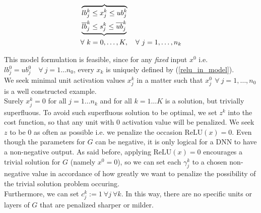 \documentclass{article}
\begin{document}
\begin{align} 
&\overbrace{
lb_j^k \leq x_j^k \leq ub_j^k} \notag \\
&\underbrace{ \overline{lb}_j^k \leq s_j^k \leq \overline{ub}_j^k }   \notag \\
& \forall \ k =0, \ldots, K, \quad \forall \ j=1, \ldots, n_k \label{MILP_model3}
\end{align}


This model formulation is feasible, since for any \textit{fixed} input $x^0$ i.e. $lb_j^0 = ub_j^0 \quad \forall \ j=1 \ldots n_0$, every $x_k$ is uniquely defined by (\ref{relu_in_model}).\\
We seek minimal unit activation values $x_j^k$ in a matter such that $x_j^0 \ \, \forall \ j=1, \ldots, n_0$ is a well constructed example.\\
Surely $x_j^k=0$ for all $j=1 \ldots n_k$ and for all $k=1 \ldots K$ is a solution, but trivially superfluous. To avoid such superfluous solution to be optimal, we set $z^k$ into the cost function, so that any unit with $0$ activation value will be penalized. We seek $z$ to be $0$ as often as possible i.e. we penalize the occasion $\text{ReLU}(x)=0$. Even though the parameters for $G$ can be negative, it is only logical for a DNN to have a non-negative output. As said before, applying $\text{ReLU}(x)=0$ encourages a trivial solution for $G$ (namely $x^0=0$), so we can set each $\gamma_j^k$ to a chosen non-negative value in accordance of how greatly we want to penalize the possibility of the trivial solution problem occuring.\\
Furthermore, we can set $c^k_j := 1 \ \forall j \ \forall k$\label{costs_of_xjk}.
In this way, there are no specific units or layers of $G$ that are penalized sharper or milder.
\end{document}
